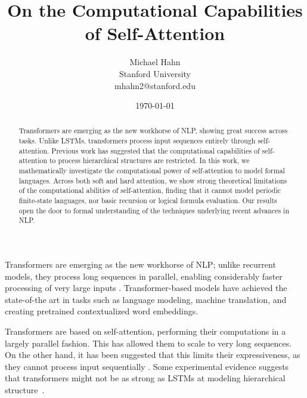 \documentclass[11pt,a4paper]{article}
\title{On the Computational Capabilities of Self-Attention}
\author{Michael Hahn \\ Stanford University \\ mhahn2@stanford.edu}
\date{\today}
\begin{document}
\maketitle
\begin{abstract}
Transformers are emerging as the new workhorse of NLP, showing great success across tasks.
Unlike LSTMs, transformers process input sequences entirely through self-attention.
Previous work has suggested that the computational capabilities of self-attention to process hierarchical structures are restricted.
In this work, we mathematically investigate the computational power of self-attention to model formal languages.
Across both soft and hard attention, we show strong theoretical limitations of the computational abilities of self-attention, finding that it cannot model periodic finite-state languages, nor basic recursion or logical formula evaluation. %
Our results open the door to formal understanding of the techniques underlying recent advances in NLP.
\end{abstract}


Transformers are emerging as the new workhorse of NLP;
unlike recurrent models, they process long sequences in parallel, enabling considerably faster processing of very large inputs \cite{vaswani2017attention}.
Transformer-based models have achieved the state-of-the art in tasks such as language modeling, machine translation, and creating pretrained contextualized word embeddings.


Transformers are based on self-attention, performing their computations in a largely parallel fashion.
This has allowed them to scale to very long sequences.
On the other hand, it has been suggested that this limits their expressiveness, as they cannot process input sequentially \cite{dehghani2018universal,shen2018disan,chen2018best,hao2019modeling}.
Some experimental evidence suggests that transformers might not be as strong as LSTMs at modeling hierarchical structure~\cite{tran2018importance}.
\end{document}
